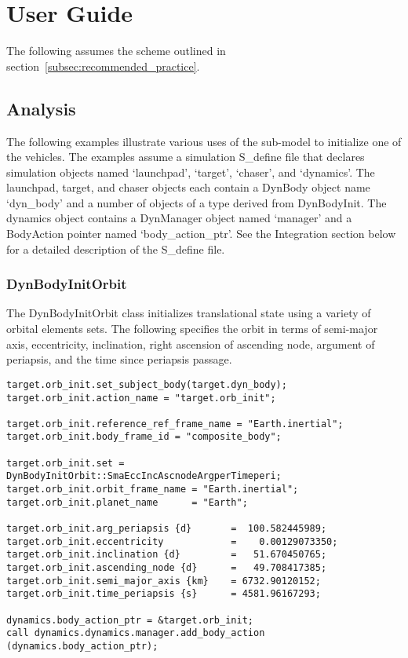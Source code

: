 %

\chapter{User Guide}\label{ch:\modelpartid:user}
The following assumes the scheme outlined in
section~\ref{subsec:recommended_practice}.

\section{Analysis}

The following examples illustrate various uses of the sub-model to
initialize one of the vehicles. The examples assume
a simulation S\_define file that declares simulation objects
named `launchpad', `target', `chaser', and `dynamics'.
The launchpad, target, and chaser objects
each contain a DynBody object name `dyn\_body'
and a number of objects of a type derived from DynBodyInit.
The dynamics object contains a DynManager object named `manager'
and a BodyAction pointer named `body\_action\_ptr'.
See the Integration section below for a detailed description of the
S\_define file.

\subsection{DynBodyInitOrbit}
The DynBodyInitOrbit class initializes translational state
using a variety of orbital elements sets.
The following specifies the orbit in terms of
semi-major axis, eccentricity, inclination,
right ascension of ascending node, argument of periapsis, and the time
since periapsis passage.

\begin{verbatim}
target.orb_init.set_subject_body(target.dyn_body);
target.orb_init.action_name = "target.orb_init";

target.orb_init.reference_ref_frame_name = "Earth.inertial";
target.orb_init.body_frame_id = "composite_body";

target.orb_init.set = DynBodyInitOrbit::SmaEccIncAscnodeArgperTimeperi;
target.orb_init.orbit_frame_name = "Earth.inertial";
target.orb_init.planet_name      = "Earth";

target.orb_init.arg_periapsis {d}       =  100.582445989;
target.orb_init.eccentricity            =    0.00129073350;
target.orb_init.inclination {d}         =   51.670450765;
target.orb_init.ascending_node {d}      =   49.708417385;
target.orb_init.semi_major_axis {km}    = 6732.90120152;
target.orb_init.time_periapsis {s}      = 4581.96167293;

dynamics.body_action_ptr = &target.orb_init;
call dynamics.dynamics.manager.add_body_action (dynamics.body_action_ptr);
\end{verbatim}

